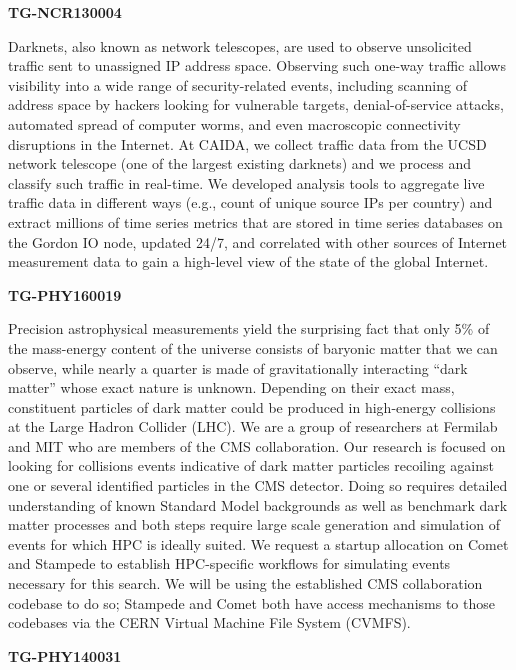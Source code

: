 \textbf{TG-NCR130004}

Darknets, also known as network telescopes, are used to observe
unsolicited traffic sent to unassigned IP address space. Observing such
one-way traffic allows visibility into a wide range of security-related
events, including scanning of address space by hackers looking for
vulnerable targets, denial-of-service attacks, automated spread of
computer worms, and even macroscopic connectivity disruptions in the
Internet. At CAIDA, we collect traffic data from the UCSD network
telescope (one of the largest existing darknets) and we process and
classify such traffic in real-time. We developed analysis tools to
aggregate live traffic data in different ways (e.g., count of unique
source IPs per country) and extract millions of time series metrics that
are stored in time series databases on the Gordon IO node, updated 24/7,
and correlated with other sources of Internet measurement data to gain a
high-level view of the state of the global Internet.

\textbf{TG-PHY160019}

Precision astrophysical measurements yield the surprising fact that only
5\% of the mass-energy content of the universe consists of baryonic
matter that we can observe, while nearly a quarter is made of
gravitationally interacting ``dark matter'' whose exact nature is
unknown. Depending on their exact mass, constituent particles of dark
matter could be produced in high-energy collisions at the Large Hadron
Collider (LHC). We are a group of researchers at Fermilab and MIT who
are members of the CMS collaboration. Our research is focused on looking
for collisions events indicative of dark matter particles recoiling
against one or several identified particles in the CMS detector. Doing
so requires detailed understanding of known Standard Model backgrounds
as well as benchmark dark matter processes and both steps require large
scale generation and simulation of events for which HPC is ideally
suited. We request a startup allocation on Comet and Stampede to
establish HPC-specific workflows for simulating events necessary for
this search. We will be using the established CMS collaboration codebase
to do so; Stampede and Comet both have access mechanisms to those
codebases via the CERN Virtual Machine File System (CVMFS).

\textbf{TG-PHY140031}

